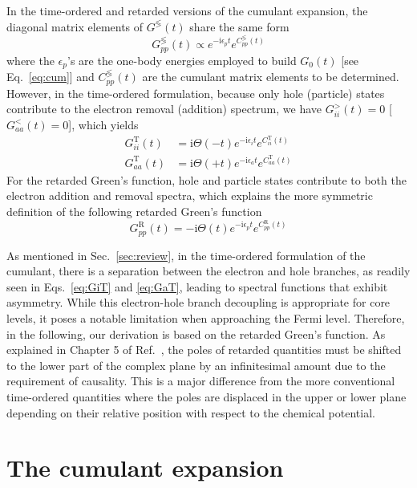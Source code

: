 \documentclass[aip,jcp,reprint,noshowkeys,superscriptaddress]{revtex4-2}
\newcommand{\eps}{\epsilon}
\newcommand{\ii}{\mathrm{i}}
\begin{document}
In the time-ordered and retarded versions of the cumulant expansion, the diagonal matrix elements of $G^{\lessgtr}(t)$ share the same form
\begin{equation}
	G_{pp}^{\lessgtr}(t)  \propto e^{-\ii \eps_{p} t} e^{C_{pp}^{\lessgtr}(t)}
\end{equation}
where the $\eps_p$'s are the one-body energies employed to build $G_0(t)$ [see Eq.~\eqref{eq:cum}] and $C_{pp}^{\lessgtr}(t)$ are the cumulant matrix elements to be determined.
However, in the time-ordered formulation, because only hole (particle) states contribute to the electron removal (addition) spectrum, we have $G_{ii}^>(t) = 0$ [$G_{aa}^<(t) = 0$], which yields
\begin{subequations}
\begin{align}
	\label{eq:GiT}
	G_{ii}^\text{T}(t)  & = \ii \Theta(-t) e^{-\ii \eps_{i} t} e^{C_{ii}^\text{T}(t)}
	\\ 
	\label{eq:GaT}
	G_{aa}^\text{T}(t)  & = \ii \Theta(+t) e^{-\ii \eps_{a} t} e^{C_{aa}^\text{T}(t)}
\end{align}
\end{subequations}
For the retarded Green's function, hole and particle states contribute to both the electron addition and removal spectra, which explains the more symmetric definition of the following retarded Green's function
\begin{equation}
	G_{pp}^\text{R}(t)  = - \ii \Theta(t) e^{-\ii \eps_{p} t} e^{C_{pp}^\text{R}(t)}
\end{equation}

As mentioned in Sec.~\ref{sec:review}, in the time-ordered formulation of the cumulant, there is a separation between the electron and hole branches, as readily seen in Eqs.~\eqref{eq:GiT} and \eqref{eq:GaT}, leading to spectral functions that exhibit asymmetry. While this electron-hole branch decoupling is appropriate for core levels, it poses a notable limitation when approaching the Fermi level. Therefore, in the following, our derivation is based on the retarded Green's function.
As explained in Chapter 5 of Ref.~, the poles of retarded quantities must be shifted to the lower part of the complex plane by an infinitesimal amount due to the requirement of causality. This is a major difference from the more conventional time-ordered quantities where the poles are displaced in the upper or lower plane depending on their relative position with respect to the chemical potential.

\section{The cumulant expansion}
\label{sec:cumulant}
\end{document}

